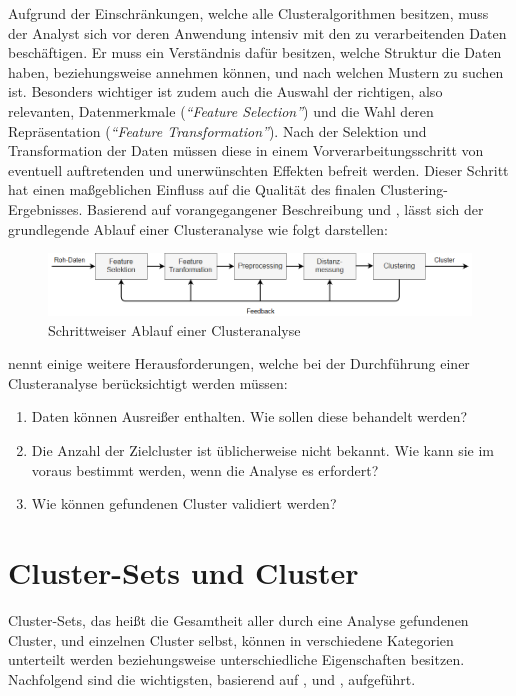 Aufgrund der Einschränkungen, welche alle Clusteralgorithmen besitzen, muss der Analyst sich vor deren Anwendung intensiv
mit den zu verarbeitenden Daten beschäftigen. Er muss ein Verständnis dafür besitzen, welche Struktur die Daten
haben, beziehungsweise annehmen können, und nach welchen Mustern zu suchen ist.
Besonders wichtiger ist zudem auch die Auswahl der richtigen, also relevanten, Datenmerkmale (\textit{``Feature Selection''})
und die Wahl deren Repräsentation (\textit{``Feature Transformation''}).
Nach der Selektion und Transformation der Daten müssen diese in einem Vorverarbeitungsschritt von eventuell auftretenden
und unerwünschten Effekten befreit werden. Dieser Schritt hat einen maßgeblichen Einfluss auf die Qualität
des finalen Clustering-Ergebnisses. Basierend auf vorangegangener Beschreibung und \cite[]{Jain1999},
lässt sich der grundlegende Ablauf einer Clusteranalyse wie folgt darstellen: \\

\begin{figure}[H]
    \centering
    \includegraphics[width=\linewidth]{resources/img/grundlagen/clustering_flow}
    \caption[Ablauf einer Clusteranalyse]{Schrittweiser Ablauf einer Clusteranalyse}
    \label{fig:grund_clustering_workflow}
\end{figure}

\cite[]{Jain2010} nennt einige weitere Herausforderungen, welche bei der Durchführung einer Clusteranalyse berücksichtigt werden müssen:

\begin{enumerate}
    \item Daten können Ausreißer enthalten. Wie sollen diese behandelt werden?
    \item Die Anzahl der Zielcluster ist üblicherweise nicht bekannt. Wie kann sie im voraus bestimmt werden, wenn die Analyse es erfordert?
    \item Wie können gefundenen Cluster validiert werden?
\end{enumerate}

\section{Cluster-Sets und Cluster}

Cluster-Sets, das heißt die Gesamtheit aller durch eine Analyse gefundenen Cluster, und einzelnen Cluster selbst,
können in verschiedene Kategorien unterteilt werden beziehungsweise unterschiedliche Eigenschaften besitzen.
Nachfolgend sind die wichtigsten, basierend auf \cite[]{tan2007introduction}, \cite[]{Jain1999} und \cite[]{Jain2010}, aufgeführt.

